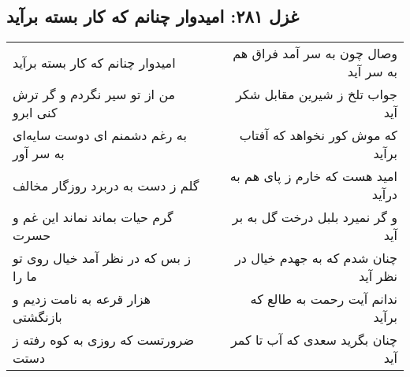 \begin{center}
\section*{غزل ۲۸۱: امیدوار چنانم که کار بسته برآید}
\label{sec:281}
\begin{longtable}{l p{0.5cm} r}
امیدوار چنانم که کار بسته برآید
&&
وصال چون به سر آمد فراق هم به سر آید
\\
من از تو سیر نگردم و گر ترش کنی ابرو
&&
جواب تلخ ز شیرین مقابل شکر آید
\\
به رغم دشمنم ای دوست سایه‌ای به سر آور
&&
که موش کور نخواهد که آفتاب برآید
\\
گلم ز دست به دربرد روزگار مخالف
&&
امید هست که خارم ز پای هم به درآید
\\
گرم حیات بماند نماند این غم و حسرت
&&
و گر نمیرد بلبل درخت گل به بر آید
\\
ز بس که در نظر آمد خیال روی تو ما را
&&
چنان شدم که به جهدم خیال در نظر آید
\\
هزار قرعه به نامت زدیم و بازنگشتی
&&
ندانم آیت رحمت به طالع که برآید
\\
ضرورتست که روزی به کوه رفته ز دستت
&&
چنان بگرید سعدی که آب تا کمر آید
\\
\end{longtable}
\end{center}
